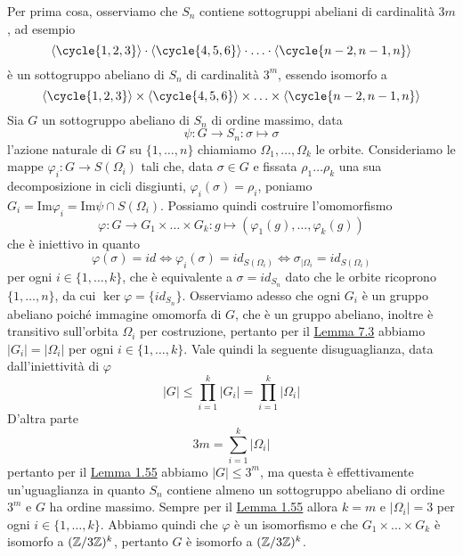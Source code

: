 \documentclass[11pt]{scrartcl}
\begin{document}
\begin{soln}
    Per prima cosa, osserviamo che $S_n$ contiene sottogruppi abeliani di
    cardinalità $3m$, ad esempio
    \[
        \langle\cycle{1, 2, 3}\rangle\cdot \langle\cycle{4, 5, 6}\rangle
        \cdot \ldots \cdot \langle\cycle{n - 2, n - 1, n}\rangle
    \]
    è un sottogruppo abeliano di $S_n$ di cardinalità $3^m$, essendo 
    isomorfo a
    \[
        \langle\cycle{1, 2, 3}\rangle\times\langle\cycle{4, 5, 6}\rangle
        \times\ldots\times\langle\cycle{n - 2, n - 1, n}\rangle
    \]
    Sia $G$ un sottogruppo abeliano di $S_n$ di ordine massimo, data
    \[
        \psi: G\longrightarrow S_n : \sigma \longmapsto \sigma
    \]
    l'azione naturale di $G$ su $\{1, \ldots, n\}$ chiamiamo $\Omega_1, \ldots, \Omega_k$
    le orbite. Consideriamo le mappe $\varphi_i : G \longrightarrow S(\Omega_i)$
    tali che, data $\sigma \in G$ e fissata $\rho_1\ldots\rho_k$ una sua decomposizione
    in cicli disgiunti, $\varphi_i(\sigma) = \rho_i$, poniamo $G_i = \mathrm{Im}\varphi_i=
    \mathrm{Im}\psi \cap S(\Omega_i)$. Possiamo quindi costruire l'omomorfismo
    \[
        \varphi: G \longrightarrow G_1\times \ldots \times G_k : g \longmapsto (\varphi_1(g), \ldots, \varphi_k(g))
    \]
    che è iniettivo in quanto 
    \[
        \varphi(\sigma) = id \iff \varphi_i(\sigma) = id_{S(\Omega_i)} \iff 
        \sigma_{\mid \Omega_i} = id_{S(\Omega_i)}
    \]
    per ogni $i \in \{1, \ldots, k\}$, che è equivalente a $\sigma = id_{S_n}$
    dato che le orbite ricoprono $\{1, \ldots, n\}$, da cui $\ker\varphi = 
    \{id_{S_n}\}$. Osserviamo adesso che ogni $G_i$ è un gruppo abeliano poiché
    immagine omomorfa di $G$, che è un gruppo abeliano, inoltre è transitivo
    sull'orbita $\Omega_i$ per costruzione, pertanto per il 
    \hyperref[lemma3.0]{Lemma 7.3} abbiamo $|G_i| = |\Omega_i|$ per ogni 
     $i \in \{1, \ldots, k\}$. Vale quindi la seguente disuguaglianza, data
    dall'iniettività di $\varphi$
    \[
        |G| \leqslant \prod_{i = 1}^k|G_i| = \prod_{i = 1}^k |\Omega_i|
    \]
    D'altra parte
    \[
        3m = \sum_{i = 1}^k|\Omega_i|
    \]pertanto per il \hyperref[lemma4.0]{Lemma 1.55} abbiamo $|G| \leq 3^m$, 
    ma questa è effettivamente un'uguaglianza in quanto $S_n$ contiene
    almeno un sottogruppo abeliano di ordine $3^m$ e $G$ ha ordine massimo.
    Sempre per il \hyperref[lemma4.0]{Lemma 1.55} allora $k = m$ e $|\Omega_i| = 3$
    per ogni $i \in \{1, \ldots, k\}$. Abbiamo quindi che $\varphi$ è un isomorfismo
    e che $G_1\times\ldots\times G_k$ è isomorfo a $(\mathbb{Z}/{3}\mathbb{Z})^k$, pertanto
    $G$ è isomorfo a $(\mathbb{Z}/{3}\mathbb{Z})^k$.
\end{soln}
\end{document}
